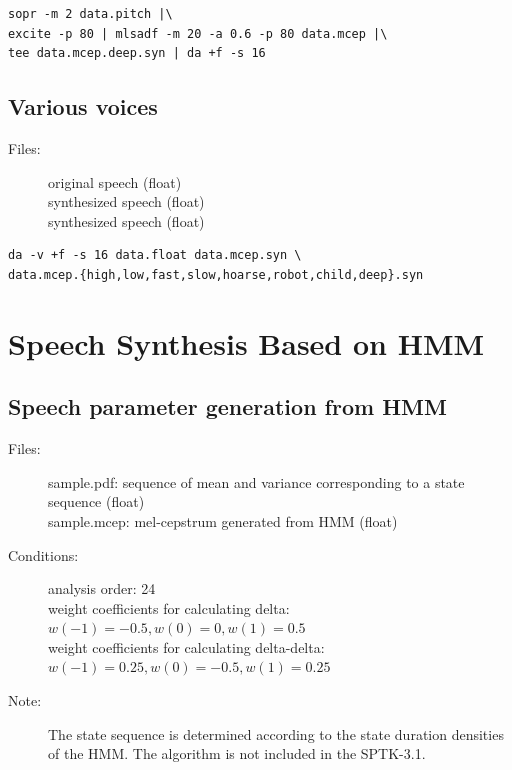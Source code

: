 \documentclass[a4paper,10pt]{article}
\begin{document}
\begin{verbatim}
sopr -m 2 data.pitch |\
excite -p 80 | mlsadf -m 20 -a 0.6 -p 80 data.mcep |\
tee data.mcep.deep.syn | da +f -s 16
\end{verbatim}

\subsection{Various voices}

\begin{description}
\item[Files:]
  original speech (float)\\
  synthesized speech (float)\\
  synthesized speech (float)
\end{description}

\begin{verbatim}
da -v +f -s 16 data.float data.mcep.syn \
data.mcep.{high,low,fast,slow,hoarse,robot,child,deep}.syn
\end{verbatim}

\section{Speech Synthesis Based on HMM}

\subsection{Speech parameter generation from HMM}

\begin{description}
\item[Files:]
  sample.pdf: sequence of mean and variance
              corresponding to a state sequence (float)\\
  sample.mcep: mel-cepstrum generated from HMM (float)
\item[Conditions:]
  analysis order: 24\\
  weight coefficients for calculating delta: $w(-1)=-0.5,w(0)=0,w(1)=0.5$\\
  weight coefficients for calculating delta-delta: $w(-1)=0.25,w(0)=-0.5,w(1)=0.25$
\item[Note:]
  The state sequence is determined according to the state
  duration densities of the HMM.  The algorithm is not included
  in the SPTK-3.1.
\end{description}
\end{document}
